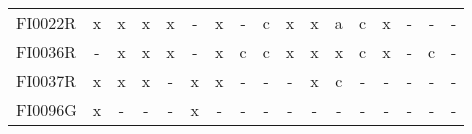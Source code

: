 \begin{table}
{{\begin{tabular}{l|cccccccccccccccc}
        FI0022R &  x &   x &    x &      x &   - &    x &    - &    c &      x &    x &    a &   c &      x &    - &    - &     - \\
        FI0036R &  - &   x &    x &      x &   - &    x &    c &    c &      x &    x &    x &   c &      x &    - &    c &     - \\
        FI0037R &  x &   x &    x &      - &   x &    x &    - &    - &      - &    x &    c &   - &      - &    - &    - &     - \\
        FI0096G &  x &   - &    - &      - &   x &    - &    - &    - &      - &    - &    - &   - &      - &    - &    - &     - \\
\bottomrule
\end{tabular}
 }}
 \end{table}




